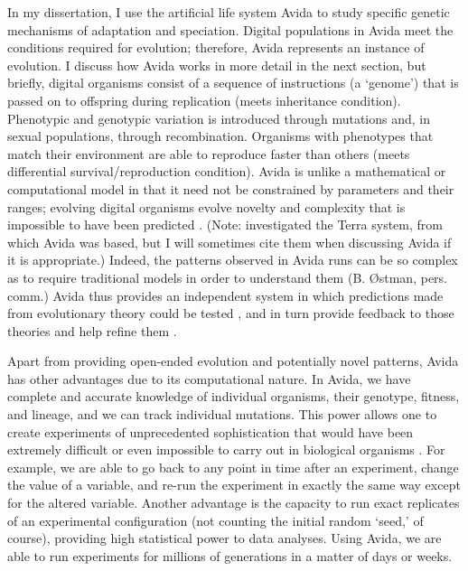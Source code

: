 \begin{doublespace}
In my dissertation, I use the artificial life system Avida \citep{ofr04}
to study specific genetic mechanisms of adaptation and speciation.
%
Digital populations in Avida meet the conditions required for evolution;
therefore, Avida represents an instance of evolution.
%
I discuss how Avida works in more detail in the next section, but briefly,
digital organisms consist of a sequence of instructions (a `genome')
that is passed on to offspring during replication (meets inheritance condition).
%
Phenotypic and genotypic variation is introduced through mutations
and, in sexual populations, through recombination.
%
Organisms with phenotypes that match their environment
are able to reproduce faster than others
(meets differential survival/reproduction condition).
%
Avida is unlike a mathematical or computational model
in that it need not be constrained by parameters and their ranges;
evolving digital organisms evolve novelty and complexity
that is impossible to have been predicted \citep{yed01,wil02}.
%
(Note: \citet{yed01} investigated the Terra system,
from which Avida was based, but I will sometimes cite them
when discussing Avida if it is appropriate.)
%
Indeed, the patterns observed in Avida runs can be so complex
as to require traditional models in order to understand them
(B. \O stman, pers. comm.)
%
Avida thus provides an independent system in which predictions
made from evolutionary theory could be tested \citep{yed01},
and in turn provide feedback to those theories
and help refine them \citep{wil02}.



Apart from providing open-ended evolution and potentially novel patterns,
Avida has other advantages due to its computational nature.
%
In Avida, we have complete and accurate knowledge of individual organisms,
their genotype, fitness, and lineage, and we can track individual mutations.
%
This power allows one to create experiments of unprecedented sophistication
that would have been extremely difficult or even impossible
to carry out in biological organisms \citep{ele03}.
%
For example, we are able to go back to any point in time after an experiment,
change the value of a variable, and re-run the experiment
in exactly the same way except for the altered variable.
%
Another advantage is the capacity to run exact replicates
of an experimental configuration
(not counting the initial random `seed,' of course),
providing high statistical power to data analyses.
%
Using Avida, we are able to run experiments for millions of generations
in a matter of days or weeks.




\end{doublespace}

